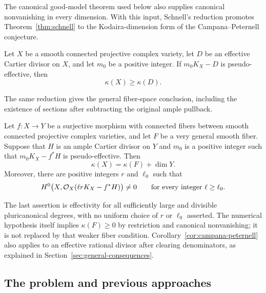 The canonical good-model theorem used below also supplies canonical
nonvanishing in every dimension. With this input, Schnell's reduction
\cite[Sections~4--10]{Schnell2022} promotes
Theorem~\ref{thm:schnell} to the Kodaira-dimension form of the
Campana--Peternell conjecture.

\begin{corollary}
\label{cor:campana-peternell}
Let $X$ be a smooth connected projective complex variety, let $D$ be
an effective Cartier divisor on $X$, and let $m_0$ be a positive
integer. If $m_0K_X-D$ is pseudo-effective, then
\[
 \kappa(X)\geq\kappa(D).
\]
\end{corollary}

The same reduction gives the general fiber-space conclusion, including
the existence of sections after subtracting the original ample
pullback.

\begin{corollary}
\label{cor:schnell-general}
Let $f\colon X\to Y$ be a surjective morphism with connected fibers
between smooth connected projective complex varieties, and let $F$ be
a very general smooth fiber. Suppose that $H$ is an ample Cartier
divisor on $Y$ and $m_0$ is a positive integer such that
$m_0K_X-f^*H$ is pseudo-effective. Then
\[
 \kappa(X)=\kappa(F)+\dim Y.
\]
Moreover, there are positive integers $r$ and $\ell_0$ such that
\[
 H^0\bigl(X,\mathcal O_X(\ell rK_X-f^*H)\bigr)\ne0
 \qquad\text{for every integer }\ell\geq\ell_0.
\]
\end{corollary}

The last assertion is effectivity for all sufficiently large and
divisible pluricanonical degrees, with no uniform choice of $r$ or
$\ell_0$ asserted. The numerical hypothesis itself implies
$\kappa(F)\geq0$ by restriction and canonical nonvanishing; it is not
replaced by that weaker fiber condition. Corollary~\ref{cor:campana-peternell}
also applies to an effective rational divisor after clearing
denominators, as explained in Section~\ref{sec:general-consequences}.

\subsection{The problem and previous approaches}

